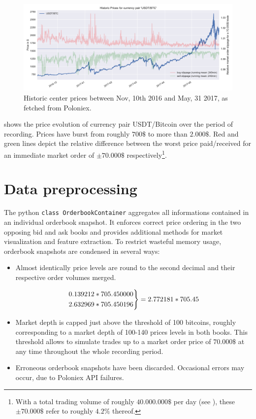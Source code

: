 \begin{figure}[ht]
	\centering
   \includegraphics[width=1.\textwidth]{content/drawings/bitcoin_historicPrices}
	\caption{Historic center prices between Nov, 10th 2016 and May, 31 2017, as fetched from Poloniex.}
	\label{fig:ploniexPriceHistory}
\end{figure}

 shows the price evolution of currency pair USDT/Bitcoin over the period of recording. Prices have burst from roughly $700\$$ to more than $2.000\$$. Red and green lines depict the relative difference between the worst price paid/received for an immediate market order of $\pm70.000\$$ respectively\footnote{With a total trading volume of roughly $40.000.000\$$ per day (see ), these $\pm70.000\$$ refer to roughly $4.2\%$ thereof.}.

\section{Data preprocessing}
\label{chap:preprocessing}
The python \lstinline!class OrderbookContainer! aggregates all informations contained in an individual orderbook snapshot. It enforces correct price ordering in the two opposing bid and ask books and provides additional methods for market visualization and feature extraction. To restrict wasteful memory usage, orderbook snapshots are condensed in several ways:

\begin{itemize}
\item Almost identically price levels are round to the second decimal and their respective order volumes merged.

 \[ 
  \begin{rcases}
    0.139212 * 705.450000\\
    2.632969 * 705.450196\\
  \end{rcases} 
  = 2.772181 * 705.45
\]
\item Market depth is capped just above the threshold of 100 bitcoins, roughly corresponding to a market depth of 100-140 prices levels in both books. This threshold allows to simulate trades up to a market order price of $70.000\$$ at any time throughout the whole recording period.

\item Erroneous orderbook snapshots have been discarded. Occasional errors may occur, due to Poloniex API failures.

\end{itemize}

